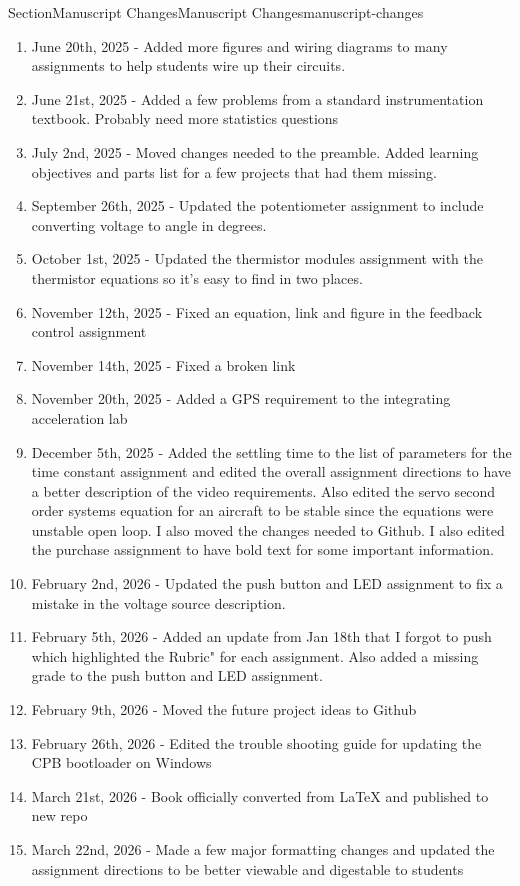 \documentclass[oneside,10pt,]{book}
\numberwithin{equation}{section}
\begin{document}
\begin{sectionptx}{Section}{Manuscript Changes}{}{Manuscript Changes}{}{}{manuscript-changes}
\begin{enumerate}
\item{}June 20th, 2025 - Added more figures and wiring diagrams to many assignments to help students wire up their circuits.%
\item{}June 21st, 2025 - Added a few problems from a standard instrumentation textbook. Probably need more statistics questions%
\item{}July 2nd, 2025 - Moved changes needed to the preamble. Added learning objectives and parts list for a few projects that had them missing.%
\item{}September 26th, 2025 - Updated the potentiometer assignment to include converting voltage to angle in degrees.%
\item{}October 1st, 2025 - Updated the thermistor modules assignment with the thermistor equations so it's easy to find in two places.%
\item{}November 12th, 2025 - Fixed an equation, link and figure in the feedback control assignment%
\item{}November 14th, 2025 - Fixed a broken link%
\item{}November 20th, 2025 - Added a GPS requirement to the integrating acceleration lab%
\item{}December 5th, 2025 - Added the settling time to the list of parameters for the time constant assignment and edited the overall assignment directions to have a better description of the video requirements. Also edited the servo second order systems equation for an aircraft to be stable since the equations were unstable open loop. I also moved the changes needed to Github. I also edited the purchase assignment to have bold text for some important information.%
\item{}February 2nd, 2026 - Updated the push button and LED assignment to fix a mistake in the voltage source description.%
\item{}February 5th, 2026 - Added an update from Jan 18th that I forgot to push which highlighted the \textasciigrave{}\textasciigrave{}Rubric" for each assignment. Also added a missing grade to the push button and LED assignment.%
\item{}February 9th, 2026 - Moved the future project ideas to Github%
\item{}February 26th, 2026 - Edited the trouble shooting guide for updating the CPB bootloader on Windows%
\item{}March 21st, 2026 - Book officially converted from LaTeX and published to new repo%
\item{}March 22nd, 2026 - Made a few major formatting changes and updated the assignment directions to be better viewable and digestable to students%

\end{enumerate}
\end{sectionptx}
\end{document}
